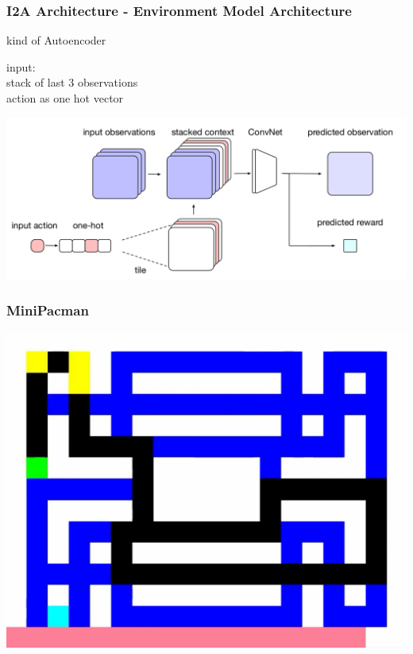 \begin{frame}
    \frametitle{I2A Architecture - Environment Model Architecture}

\begin{multicols}{2}
	\begin{PraesentationAufzaehlung}
		\item kind of Autoencoder
		\item input:\\
		stack of last 3 observations\\
		action as one hot vector
	\end{PraesentationAufzaehlung}
    \vfill\columnbreak
	\begin{center}
    \includegraphics[width=\columnwidth]{./Images/environment_model_architecture.png}%
	\end{center}
\end{multicols}
    
\end{frame}
\clearpage


 
\PraesentationMasterWeissBlau 
\begin{frame} 
    \frametitle{MiniPacman}
\includegraphics[height=0.5\textheight]{./Images/mini_pacman.png}%
\end{frame} 

